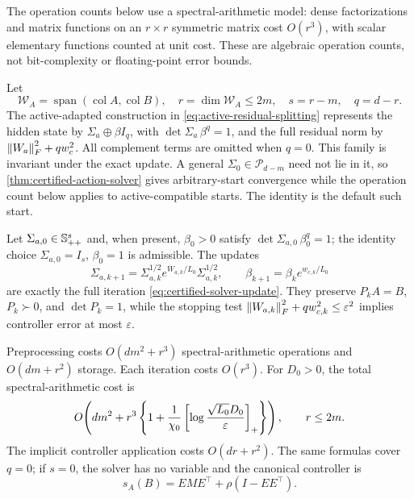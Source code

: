The operation counts below use a spectral-arithmetic model: dense
factorizations and matrix functions on an \(r\times r\) symmetric matrix cost
\(O(r^3)\), with scalar elementary functions counted at unit cost.  These are
algebraic operation counts, not bit-complexity or floating-point error bounds.

Let
\[
  \mathcal W_A
  =\operatorname{span}(\operatorname{col}A,\operatorname{col}B),
  \quad
  r=\dim\mathcal W_A\le2m,
  \quad
  s=r-m,
  \quad
  q=d-r.
\]
The active-adapted construction in
\cref{eq:active-residual-splitting} represents the hidden state by
\(\Sigma_a\oplus\beta I_q\), with
\(\det\Sigma_a\,\beta^q=1\), and the full residual norm by
\(\left\lVert W_a\right\rVert_F^2+qw_c^2\).  All complement terms are omitted when \(q=0\).
This family is invariant under the exact update.  A general
\(\Sigma_0\in\mathscr P_{d-m}\) need not lie in it, so
\cref{thm:certified-action-solver} gives arbitrary-start convergence while the
operation count below applies to active-compatible starts.  The identity is
the default such start.

\begin{corollary}
\label{cor:active-core-solver}
Let \(\Sigma_{a,0}\in\mathbb{S}_{++}^s\) and, when present, \(\beta_0>0\) satisfy
\(\det\Sigma_{a,0}\,\beta_0^q=1\); the identity choice
\(\Sigma_{a,0}=I_s\), \(\beta_0=1\) is admissible.  The updates
\begin{equation}
  \Sigma_{a,k+1}
  =\Sigma_{a,k}^{1/2}e^{W_{a,k}/L_0}\Sigma_{a,k}^{1/2},
  \qquad
  \beta_{k+1}=\beta_ke^{w_{c,k}/L_0}
  \label{eq:active-solver-update}
\end{equation}
are exactly the full iteration \eqref{eq:certified-solver-update}.  They
preserve \(P_kA=B\), \(P_k\succ0\), and \(\det P_k=1\), while the stopping
test \(\left\lVert W_{a,k}\right\rVert_F^2+qw_{c,k}^2\le\varepsilon^2\) implies controller
error at most \(\varepsilon\).

Preprocessing costs \(O(dm^2+r^3)\) spectral-arithmetic operations and
\(O(dm+r^2)\) storage.  Each iteration costs \(O(r^3)\).  For \(D_0>0\), the total
spectral-arithmetic
cost is
\begin{equation}
  O\!\left(
  dm^2+
  r^3\left\{
  1+\frac1{\chi_0}
  \left[\log\frac{\sqrt{L_0}D_0}{\varepsilon}\right]_+
  \right\}\right),
  \qquad r\le2m.
  \label{eq:active-total-complexity}
\end{equation}
The implicit controller application costs \(O(dr+r^2)\).  The same formulas
cover \(q=0\); if \(s=0\), the solver has no variable and the canonical
controller is
\[
  s_A(B)=EME^\top+\rho(I-EE^\top).
\]
\end{corollary}

